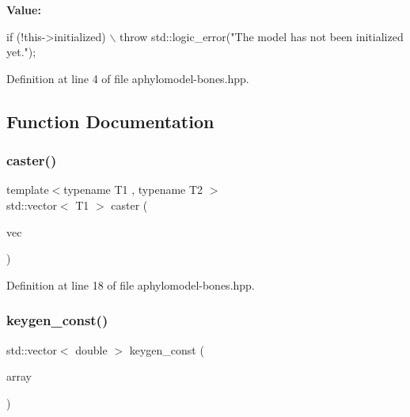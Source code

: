 {\bfseries Value\+:}
\begin{DoxyCode}
\textcolor{keywordflow}{if} (!this->initialized) \(\backslash\)
    throw std::logic\_error(\textcolor{stringliteral}{"The model has not been initialized yet."});
\end{DoxyCode}


Definition at line 4 of file aphylomodel-\/bones.\+hpp.



\subsection{Function Documentation}
\mbox{\label{aphylomodel-bones_8hpp_a1f293b9028bf34b1aa8506c8f0af4413}} 
\subsubsection{\texorpdfstring{caster()}{caster()}}
{\footnotesize\ttfamily template$<$typename T1 , typename T2 $>$ \\
std\+::vector$<$ T1 $>$ caster (\begin{DoxyParamCaption}\item[{const std\+::vector$<$ T2 $>$ \&}]{vec }\end{DoxyParamCaption})}



Definition at line 18 of file aphylomodel-\/bones.\+hpp.

\mbox{\label{aphylomodel-bones_8hpp_a513c16e4b1a39f810501041e7b8fa448}} 
\subsubsection{\texorpdfstring{keygen\+\_\+const()}{keygen\_const()}}
{\footnotesize\ttfamily std\+::vector$<$ double $>$ keygen\+\_\+const (\begin{DoxyParamCaption}\item[{const \hyperlink{namespacebarry_1_1counters_1_1phylo_abd293bf65e494e903639fb5fb2c91604}{phylocounters\+::\+Phylo\+Array} \&}]{array }\end{DoxyParamCaption})\hspace{0.3cm}{\ttfamily [inline]}}



